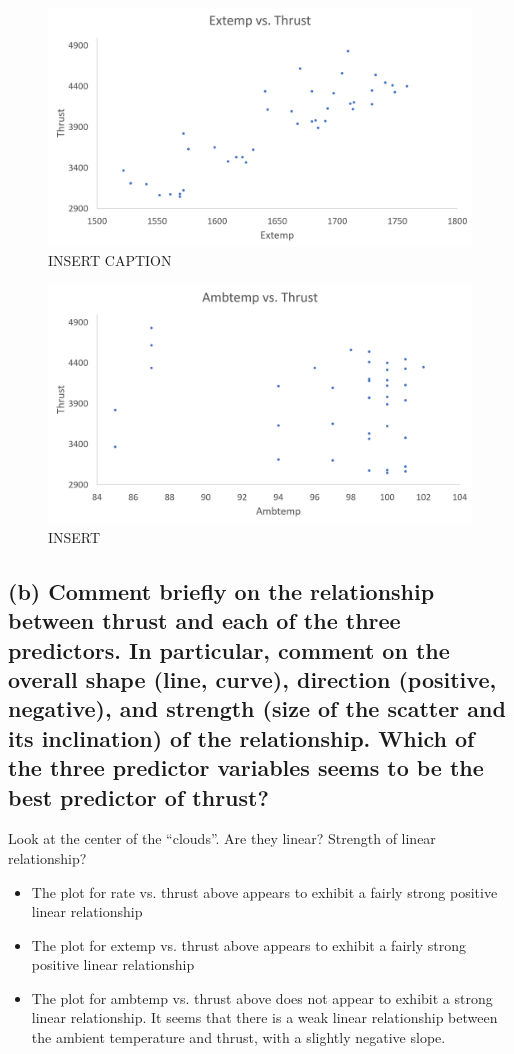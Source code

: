 \documentclass[letterpaper]{article}
\begin{document}
\begin{figure}[H]
 \centering
 \includegraphics[width=\textwidth]{extempthrust.png}
 \caption{INSERT CAPTION}
\end{figure}

\begin{figure}[H]
 \centering
 \includegraphics[width=\textwidth]{ambtempthrust.png}
 \caption{INSERT}
\end{figure}

\subsection{(b)	Comment briefly on the relationship between thrust and each of the three predictors. In particular, comment on the overall shape (line, curve), direction (positive, negative), and strength (size of the scatter and its inclination) of the relationship. Which of the three predictor variables seems to be the best predictor of thrust? }
Look at the center of the “clouds”.  Are they linear? Strength of
linear relationship?

\begin{itemize}
 \item The plot for rate vs. thrust above appears to exhibit a fairly strong positive
       linear relationship
 \item The plot for extemp vs. thrust above appears to exhibit a fairly strong positive
       linear relationship
 \item The plot for ambtemp vs. thrust above does not appear to exhibit a strong linear
       relationship. It seems that there is a weak linear
       relationship between the ambient temperature and thrust, with a slightly negative slope.
\end{itemize}
\end{document}
